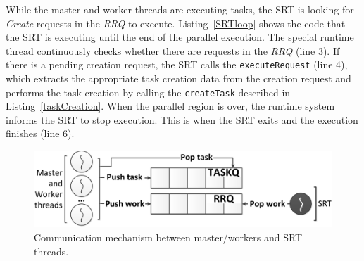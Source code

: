 While the master and worker threads are executing tasks, the SRT is looking for \textit{Create} requests in the \textit{RRQ} to execute.
Listing~\ref{SRTloop} shows the code that the SRT is executing until the end of the parallel execution.
The special runtime thread continuously checks whether there are requests in the \textit{RRQ} (line 3). 
If there is a pending creation request, the SRT calls the \texttt{executeRequest} (line 4), which extracts the appropriate task creation data from the creation request and performs the task creation by calling the \texttt{createTask} described in Listing~\ref{taskCreation}.
When the parallel region is over, the runtime system informs the SRT to stop execution.
This is when the SRT exits and the execution finishes (line 6).


\begin{figure}[t]%
	\centering
	\includegraphics[width=1.0\columnwidth]{figures/communication2.pdf}
	\vspace{-0.5cm}
	\caption{Communication mechanism between master/workers and SRT threads.}
	\label{fig:communication}%
	\vspace{-0.3cm}
\end{figure}




